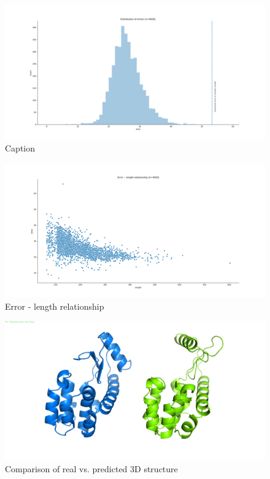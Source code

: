 \begin{figure}
    \centering
    \includegraphics[width=\linewidth]{imgs_andy/error_distribution_200430m93s4000.png}
    \caption{Caption}
    \label{fig:error_dist}
\end{figure}

\begin{figure}
    \centering
    \includegraphics[width=\linewidth]{imgs_andy/error_length_200430m93s4000.png}
    \caption{Error - length relationship}
    \label{fig:err_len}
\end{figure}

\begin{figure}
    \centering
    \includegraphics[width=\linewidth]{imgs_andy/139lA00_real_pred_3D_v2.png}
    \caption{Comparison of real vs. predicted 3D structure}
    \label{fig:real_pred}
\end{figure}

